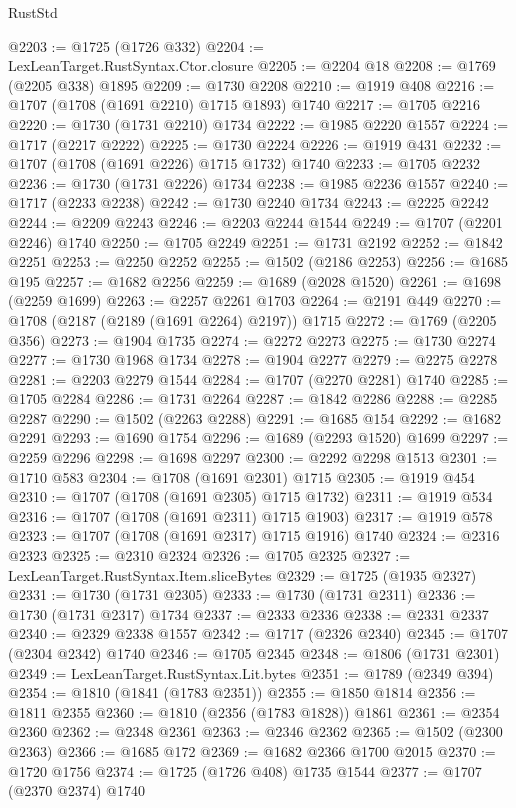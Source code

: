 \begin{lexlean}{RustStd}
\begin{coremodule}
@2203 := @1725 (@1726 @332)
@2204 := LexLeanTarget.RustSyntax.Ctor.closure
@2205 := @2204 @18
@2208 := @1769 (@2205 @338) @1895
@2209 := @1730 @2208
@2210 := @1919 @408
@2216 := @1707 (@1708 (@1691 @2210) @1715 @1893) @1740
@2217 := @1705 @2216
@2220 := @1730 (@1731 @2210) @1734
@2222 := @1985 @2220 @1557
@2224 := @1717 (@2217 @2222)
@2225 := @1730 @2224
@2226 := @1919 @431
@2232 := @1707 (@1708 (@1691 @2226) @1715 @1732) @1740
@2233 := @1705 @2232
@2236 := @1730 (@1731 @2226) @1734
@2238 := @1985 @2236 @1557
@2240 := @1717 (@2233 @2238)
@2242 := @1730 @2240 @1734
@2243 := @2225 @2242
@2244 := @2209 @2243
@2246 := @2203 @2244 @1544
@2249 := @1707 (@2201 @2246) @1740
@2250 := @1705 @2249
@2251 := @1731 @2192
@2252 := @1842 @2251
@2253 := @2250 @2252
@2255 := @1502 (@2186 @2253)
@2256 := @1685 @195
@2257 := @1682 @2256
@2259 := @1689 (@2028 @1520)
@2261 := @1698 (@2259 @1699)
@2263 := @2257 @2261 @1703
@2264 := @2191 @449
@2270 := @1708 (@2187 (@2189 (@1691 @2264) @2197)) @1715
@2272 := @1769 (@2205 @356)
@2273 := @1904 @1735
@2274 := @2272 @2273
@2275 := @1730 @2274
@2277 := @1730 @1968 @1734
@2278 := @1904 @2277
@2279 := @2275 @2278
@2281 := @2203 @2279 @1544
@2284 := @1707 (@2270 @2281) @1740
@2285 := @1705 @2284
@2286 := @1731 @2264
@2287 := @1842 @2286
@2288 := @2285 @2287
@2290 := @1502 (@2263 @2288)
@2291 := @1685 @154
@2292 := @1682 @2291
@2293 := @1690 @1754
@2296 := @1689 (@2293 @1520) @1699
@2297 := @2259 @2296
@2298 := @1698 @2297
@2300 := @2292 @2298 @1513
@2301 := @1710 @583
@2304 := @1708 (@1691 @2301) @1715
@2305 := @1919 @454
@2310 := @1707 (@1708 (@1691 @2305) @1715 @1732)
@2311 := @1919 @534
@2316 := @1707 (@1708 (@1691 @2311) @1715 @1903)
@2317 := @1919 @578
@2323 := @1707 (@1708 (@1691 @2317) @1715 @1916) @1740
@2324 := @2316 @2323
@2325 := @2310 @2324
@2326 := @1705 @2325
@2327 := LexLeanTarget.RustSyntax.Item.sliceBytes
@2329 := @1725 (@1935 @2327)
@2331 := @1730 (@1731 @2305)
@2333 := @1730 (@1731 @2311)
@2336 := @1730 (@1731 @2317) @1734
@2337 := @2333 @2336
@2338 := @2331 @2337
@2340 := @2329 @2338 @1557
@2342 := @1717 (@2326 @2340)
@2345 := @1707 (@2304 @2342) @1740
@2346 := @1705 @2345
@2348 := @1806 (@1731 @2301)
@2349 := LexLeanTarget.RustSyntax.Lit.bytes
@2351 := @1789 (@2349 @394)
@2354 := @1810 (@1841 (@1783 @2351))
@2355 := @1850 @1814
@2356 := @1811 @2355
@2360 := @1810 (@2356 (@1783 @1828)) @1861
@2361 := @2354 @2360
@2362 := @2348 @2361
@2363 := @2346 @2362
@2365 := @1502 (@2300 @2363)
@2366 := @1685 @172
@2369 := @1682 @2366 @1700 @2015
@2370 := @1720 @1756
@2374 := @1725 (@1726 @408) @1735 @1544
@2377 := @1707 (@2370 @2374) @1740

\end{coremodule}
\end{lexlean}
